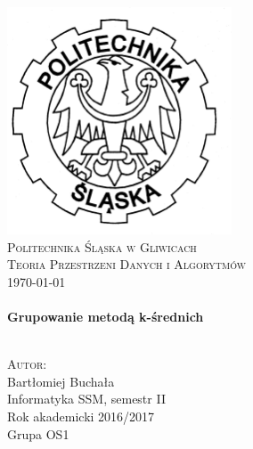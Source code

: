 \begin{titlepage}
	\begin{center}
		
		\includegraphics[width=0.5\textwidth]{logo.png}~\\[1cm]
		
		\textsc{\LARGE Politechnika Śląska w Gliwicach}\\[1.5cm]
		
		\textsc{\Large Teoria Przestrzeni Danych i Algorytmów}\\
		\textsc{\today}\\[0.5cm]
		
		\HRule \\[0.4cm]
		{ \huge \bfseries Grupowanie metodą k-średnich \\[0.4cm] }
		
		\HRule \\[1.5cm]
		
		\textsc{\Large Autor:} \\
		Bartłomiej Buchała \\
		[1.0cm]
		Informatyka SSM, semestr II \\
		Rok akademicki 2016/2017 \\
		Grupa OS1
		
		\vfill

	\vfill
\end{center}
\end{titlepage}